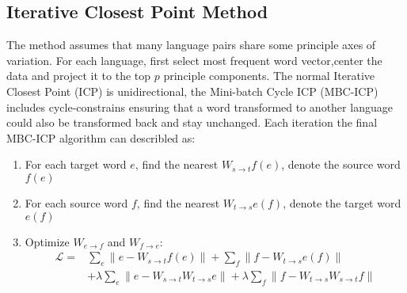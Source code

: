 \subsection{Iterative Closest Point Method}
The method assumes that many language pairs share some principle axes of variation. For each language, first select most frequent word vector,center the data and project it to the top ${p}$ principle components.
The normal Iterative Closest Point (ICP) is unidirectional, the Mini-batch Cycle ICP (MBC-ICP) includes cycle-constrains ensuring that a word transformed to another language could also be transformed back and stay unchanged. Each iteration the final MBC-ICP algorithm can describled as: 
 
\begin{enumerate}
	\item For each target word ${e}$, find the nearest ${W_{s\rightarrow t} f(e)}$, denote the source word ${f(e)}$
	\item For each source word ${f}$, find the nearest ${W_{t\rightarrow s} e(f)}$, denote the target word ${e(f)}$
	\item Optimize ${W_{e\rightarrow f}}$ and ${W_{f\rightarrow e}}$: 
	\begin{align*}
		\mathcal{L} = &  \sum_{e} {\lVert e - W_{s\rightarrow t} f(e)\rVert} + \sum_f {\rVert f - W_{t \rightarrow s} e(f)\rVert} \\ 
		& + \lambda {\sum_e}{\lVert e - W_{s\rightarrow t} W_{t\rightarrow s} e \rVert}  +  \lambda \sum_f {\lVert f - W_{t\rightarrow s} W_{s \rightarrow t} f \rVert}
	\end{align*}

\end{enumerate}
